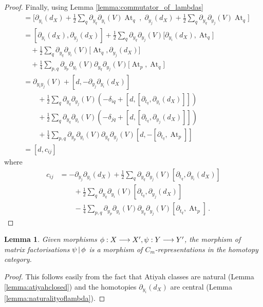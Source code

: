 \documentclass[english,letter paper,12pt,leqno]{article}
\newtheorem{lemma}[theorem]{Lemma}
\theoremstyle{example}
\numberwithin{equation}{section}
\def\fermc{\gamma^\dagger}
\DeclareMathOperator{\At}{At}
\begin{document}
\begin{proof}
Finally, using Lemma \ref{lemma:commutator_of_lambdas}
\begin{align*}
[ \fermc_i, \fermc_j ] &= \Big[ \partial_{y_i}(d_X) + \frac{1}{2} \sum_q \partial_{y_q} \partial_{y_i}(V) \At_{q}\; , \; \partial_{y_j}(d_X) + \frac{1}{2} \sum_q \partial_{y_q}\partial_{y_j}(V) \At_{q} \Big]\\
&= [ \partial_{y_i}(d_X), \partial_{y_j}(d_X) ] + \frac{1}{2}\sum_q \partial_{y_q}\partial_{y_j}(V) \big[ \partial_{y_i}(d_X), \At_q \big]\\
&\quad + \frac{1}{2}\sum_q \partial_{y_q} \partial_{y_i}(V) \big[ \At_q, \partial_{y_j}(d_X) \big]\\
&\quad + \frac{1}{4}\sum_{p,q} \partial_{y_p} \partial_{y_i}(V) \partial_{y_q} \partial_{y_j}(V) \big[ \At_p, \At_q \big]\\
&= \partial_{y_iy_j}(V) + [d, - \partial_{y_j} \partial_{y_i}(d_X)]\\
&\qquad + \frac{1}{2}\sum_q \partial_{y_q} \partial_{y_j}(V) \left( -\delta_{iq} + [d, [ \partial_{t_q}, \partial_{y_i}(d_X)]] \right)\\
&\qquad + \frac{1}{2} \sum_q \partial_{y_q} \partial_{y_i}(V) \left( -\delta_{jq} + [d, [\partial_{t_q}, \partial_{y_j}(d_X)]] \right)\\
&\qquad + \frac{1}{4}\sum_{p,q} \partial_{y_p} \partial_{y_i}(V) \partial_{y_q} \partial_{y_j}(V) [d, -[\partial_{t_q}, \At_p]]\\
&= [d, c_{ij}]
\end{align*}
where
\begin{align*}
c_{ij} &= - \partial_{y_j} \partial_{y_i}(d_X) + \frac{1}{2} \sum_q \partial_{y_q} \partial_{y_j}(V)  [\partial_{t_q}, \partial_{y_i}(d_X)]\\
&\qquad + \frac{1}{2} \sum_q \partial_{y_q} \partial_{y_i}(V) [\partial_{t_q}, \partial_{y_j}(d_X)]\\
&\qquad - \frac{1}{4} \sum_{p,q}  \partial_{y_p} \partial_{y_i}(V) \partial_{y_q} \partial_{y_j}(V)  [\partial_{t_q}, \At_p]\,.
\end{align*}
\end{proof}

\begin{lemma}\label{prop:morphismsarecliffordreps} Given morphisms $\phi: X \longrightarrow X', \psi: Y \longrightarrow Y'$, the morphism of matrix factorisations $\psi \,|\, \phi$ is a morphism of $C_m$-representations in the homotopy category.
\end{lemma}
\begin{proof}
This follows easily from the fact that Atiyah classes are natural (Lemma \ref{lemma:atiyahclosed}) and the homotopies $\partial_{y_i}(d_X)$ are central (Lemma \ref{lemma:naturalityoflambda}).
\end{proof}
\end{document}
